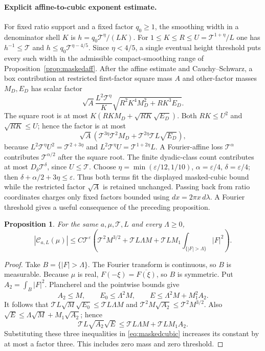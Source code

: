 \documentclass[11pt,a4paper,oneside]{article}
\newtheorem{proposition}[theorem]{Proposition}
\theoremstyle{definition}
\newcommand{\eps}{\varepsilon}
\numberwithin{equation}{section}
\begin{document}
\paragraph{Explicit affine-to-cubic exponent estimate.}
For fixed ratio support and a fixed factor $q_0\ge1$, the smoothing width
in a denominator shell $K$ is $h=q_0\mathcal T^\eta/(LK)$.
For $1\le K\le R\le U=\mathcal T^{1+\eta}/L$ one has
$h^{-1}\le\mathcal T$ and
$h\le q_0\mathcal T^{\eta-4/5}$. Since $\eta<4/5$, a single eventual
height threshold puts every such width in the admissible compact-smoothing
range of Proposition~\ref{prop:maskedaff}.
After the affine estimate and Cauchy--Schwarz, a box contribution at restricted
first-factor square mass $A$ and other-factor masses $M_D,E_D$ has scalar factor
\[
 \sqrt A\frac{L^2\mathcal T^\eta}{K}
       \sqrt{R^2K^4M_D^2+RK^3E_D}.
\]
The square root is at most $K(RKM_D+\sqrt{RK}\sqrt{E_D})$.
Both $RK\le U^2$ and $\sqrt{RK}\le U$; hence the factor is at most
\[
 \sqrt A\left(\mathcal T^{3\eta}\mathcal T^2M_D
                +\mathcal T^{2\eta}\mathcal TL\sqrt{E_D}\right),
\]
because $L^2\mathcal T^\eta U^2=\mathcal T^{2+3\eta}$ and
$L^2\mathcal T^\eta U=\mathcal T^{1+2\eta}L$.
A Fourier-affine loss $\mathcal T^\alpha$ contributes
$\mathcal T^{\alpha/2}$ after the square root. The finite dyadic-class
count contributes at most $D_\delta\mathcal T^\delta$, since $U\le\mathcal T$.
Choose $\eta=\min(\eps/12,1/10)$, $\alpha=\eps/4$, $\delta=\eps/4$;
then $\delta+\alpha/2+3\eta\le\eps$.
Thus both terms fit the displayed masked-cubic bound while the restricted
factor $\sqrt A$ is retained unchanged. Passing back from ratio coordinates
charges only fixed factors bounded using $dx=2\pi x\,d\lambda$.
A Fourier threshold gives a useful consequence of the preceding proposition.
\begin{proposition}\label{prop:restricted}
For the same $a,\mu,\mathcal T,L$ and every $\Lambda\ge0$,
\begin{equation*}
 |\mathcal C_{a,L}(\mu)|\le C\mathcal T^\eps
  \left(\mathcal T^2M^{3/2}+\mathcal TL\Lambda M
       +\mathcal TL M_1\int_{\{|F|>\Lambda\}}|F|^2\right).
\end{equation*}
\end{proposition}
\begin{proof}
Take $B=\{|F|>\Lambda\}$. The Fourier transform is continuous, so $B$ is
measurable. Because $\mu$ is real, $F(-\xi)=\overline{F(\xi)}$, so $B$ is
symmetric. Put $A_2=\int_B|F|^2$. Plancherel and the pointwise bounds give
\[
 A_2\le M,\qquad E_0\le\Lambda^2M,\qquad
 E\le\Lambda^2M+M_1^2A_2.
\]
It follows that $\mathcal TL\sqrt M\sqrt{E_0}\le\mathcal TL\Lambda M$
and $\mathcal T^2M\sqrt{A_2}\le\mathcal T^2M^{3/2}$.
Also $\sqrt E\le\Lambda\sqrt M+M_1\sqrt{A_2}$; hence
\[
 \mathcal TL\sqrt{A_2}\sqrt E
 \le\mathcal TL\Lambda M+\mathcal TL M_1A_2.
\]
Substituting these three inequalities in \eqref{eq:maskedcubic} increases its
constant by at most a factor three. This includes zero mass and zero threshold.
\end{proof}
\end{document}
